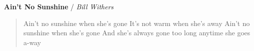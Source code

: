 \newpage
\Huge
\textbf{Ain't No Sunshine} / \textsl{Bill Withers} \\
\years{
\Aminor\\
\Eminor\\
\Dminor\\
\Gmajor
}
\begin{verse}
\large
{}Ain't no sunshine when she's gone
It's not warm when she's away
Ain't no sunshine when she's gone
And she's always gone too long anytime she goes a-way
\end{verse}
